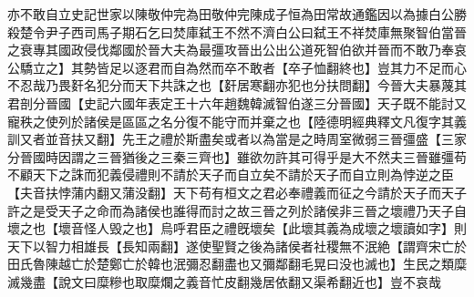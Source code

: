 亦不敢自立史記世家以陳敬仲完為田敬仲完陳成子恒為田常故通鑑因以為據白公勝殺楚令尹子西司馬子期石乞曰焚庫弑王不然不濟白公曰弑王不祥焚庫無聚智伯當晉之衰專其國政侵伐鄰國於晉大夫為最彊攻晉出公出公道死智伯欲并晉而不敢乃奉哀公驕立之】其勢皆足以逐君而自為然而卒不敢者【卒子恤翻終也】豈其力不足而心不忍哉乃畏姧名犯分而天下共誅之也【姧居寒翻亦犯也分扶問翻】今晉大夫暴蔑其君剖分晉國【史記六國年表定王十六年趙魏韓滅智伯遂三分晉國】天子既不能討又寵秩之使列於諸侯是區區之名分復不能守而并棄之也【陸德明經典釋文凡復字其義訓又者並音扶又翻】先王之禮於斯盡矣或者以為當是之時周室微弱三晉彊盛【三家分晉國時因謂之三晉猶後之三秦三齊也】雖欲勿許其可得乎是大不然夫三晉雖彊苟不顧天下之誅而犯義侵禮則不請於天子而自立矣不請於天子而自立則為悖逆之臣【夫音扶悖蒲内翻又蒲没翻】天下苟有桓文之君必奉禮義而征之今請於天子而天子許之是受天子之命而為諸侯也誰得而討之故三晉之列於諸侯非三晉之壞禮乃天子自壞之也【壞音怪人毁之也】烏呼君臣之禮旣壞矣【此壞其義為成壞之壞讀如字】則天下以智力相雄長【長知兩翻】遂使聖賢之後為諸侯者社稷無不泯絶【謂齊宋亡於田氏魯陳越亡於楚鄭亡於韓也泯彌忍翻盡也又彌鄰翻毛晃曰没也滅也】生民之類糜滅幾盡【說文曰糜糝也取糜爛之義音忙皮翻幾居依翻又渠希翻近也】豈不哀哉

